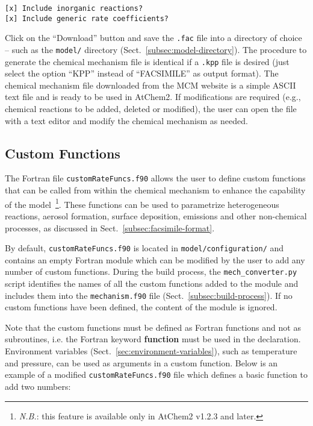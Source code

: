\begin{verbatim}
[x] Include inorganic reactions?
[x] Include generic rate coefficients?
\end{verbatim}

Click on the ``Download'' button and save the \texttt{.fac} file into
a directory of choice -- such as the \texttt{model/} directory
(Sect.~\ref{subsec:model-directory}). The procedure to generate the
chemical mechanism file is identical if a \texttt{.kpp} file is
desired (just select the option ``KPP'' instead of ``FACSIMILE'' as
output format). The chemical mechanism file downloaded from the MCM
website is a simple ASCII text file and is ready to be used in
AtChem2. If modifications are required (e.g., chemical reactions to be
added, deleted or modified), the user can open the file with a text
editor and modify the chemical mechanism as needed.

\subsection{Custom Functions} \label{subsec:custom-functions}

The Fortran file \texttt{customRateFuncs.f90} allows the user to
define custom functions that can be called from within the chemical
mechanism to enhance the capability of the model~\footnote{\emph{N.B.}:
  this feature is available only in AtChem2 v1.2.3 and later.}. These
functions can be used to parametrize heterogeneous reactions, aerosol
formation, surface deposition, emissions and other non-chemical
processes, as discussed in Sect.~\ref{subsec:facsimile-format}.

By default, \texttt{customRateFuncs.f90} is located in
\texttt{model/configuration/} and contains an empty Fortran module
which can be modified by the user to add any number of custom
functions. During the build process, the \texttt{mech\_converter.py}
script identifies the names of all the custom functions added to the
module and includes them into the \texttt{mechanism.f90} file
(Sect.~\ref{subsec:build-process}). If no custom functions have been
defined, the content of the module is ignored.

Note that the custom functions must be defined as Fortran functions
and not as subroutines, i.e. the Fortran keyword \textbf{function}
must be used in the declaration. Environment variables
(Sect.~\ref{sec:environment-variables}), such as temperature and
pressure, can be used as arguments in a custom function. Below is an
example of a modified \texttt{customRateFuncs.f90} file which defines
a basic function to add two numbers:

